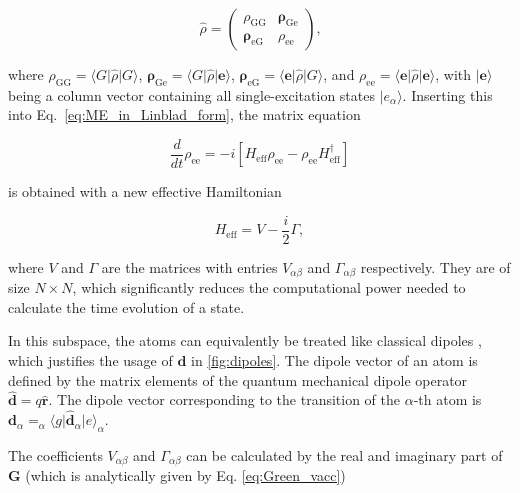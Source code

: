 \begin{equation}
    \hat{\rho} = \begin{pmatrix}
        \rho_{\text{GG}} & \bm{\rho}_{\text{Ge}} \\
        \bm{\rho}_{\text{eG}} & \rho_{\text{ee}}
        \end{pmatrix} \text{,}
\end{equation}

\noindent
where $\rho_{\text{GG}} = \langle G \vert \hat{\rho} \vert G \rangle$,
$\bm{\rho}_{\text{Ge}} = \langle G \vert \hat{\rho} \vert \bm{e} \rangle$,
$\bm{\rho}_{\text{eG}} = \langle \bm{e} \vert \hat{\rho} \vert G \rangle$, and
$\rho_{\text{ee}} = \langle \bm{e} \vert \hat{\rho} \vert \bm{e} \rangle$,
with $\vert \bm{e} \rangle$ being a column vector
containing all single-excitation states $\vert e_{\alpha} \rangle$.
Inserting this into Eq.~\eqref{eq:ME_in_Linblad_form}, the matrix equation

\begin{equation}
    \frac{d}{dt} \rho_{\text{ee}} = -i \left[ H_{\text{eff}} \rho_{\text{ee}} - \rho_{\text{ee}} H_{\text{eff}}^\dagger \right]
\end{equation}

\noindent
is obtained with a new effective Hamiltonian

\begin{equation} \label{eq:reduces_H_eff}
    H_{\text{eff}} = V - \frac{i}{2} \Gamma,
\end{equation}

\noindent
where $ V $ and $ \Gamma $ are the matrices
with entries $V_{\alpha \beta}$ and $\Gamma_{\alpha \beta}$ respectively.
They are of size $N \times N $, which significantly reduces the computational power needed to calculate the time evolution of a state.

\noindent
In this subspace, the atoms can equivalently be treated like classical dipoles \cite{AsenjoGarcia2017},
which justifies the usage of $\mathbf{d}$ in \autoref{fig:dipoles}.
The dipole vector of an atom is defined by the matrix elements of the quantum mechanical dipole operator $\hat{\mathbf{d}} = q \mathbf{\hat{r}} $. %
The dipole vector corresponding to the transition of the $\alpha$-th atom is $\mathbf{d}_\alpha = _{\alpha}\langle g \vert \hat{\mathbf{d}}_\alpha \vert  e \rangle_{\alpha}$.


\noindent
The coefficients $V_{\alpha \beta}$ and $\Gamma_{\alpha \beta}$ can be calculated by the real and imaginary part of
$\mathbf{G}$ (which is analytically given by Eq. \eqref{eq:Green_vacc}) \cite{Asenjo-Garcia2017}

